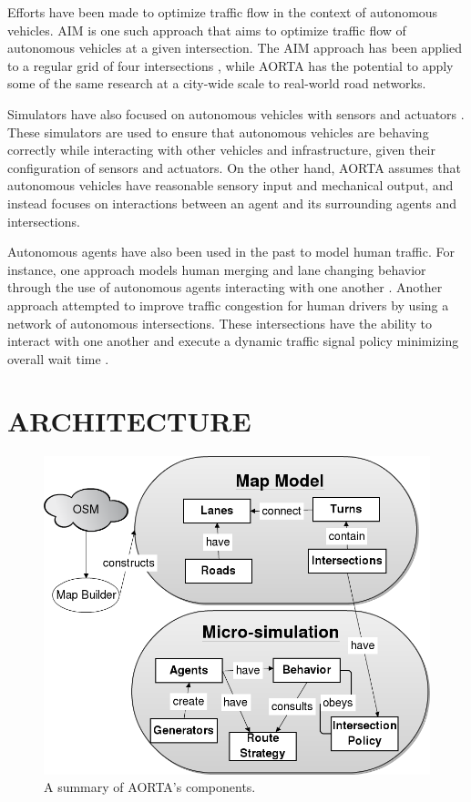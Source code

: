 \documentclass[letterpaper, 10 pt, conference]{ieeeconf}  %
\begin{document}
Efforts have been made to optimize traffic flow in the context of autonomous
vehicles. AIM \cite{JAIR08-dresner} is one such approach that aims to optimize
traffic flow of autonomous vehicles at a given intersection. The AIM approach
has been applied to a regular grid of four intersections
\cite{IROS11-hausknecht}, while AORTA has the potential to apply some of the
same research at a city-wide scale to real-world road networks.

Simulators have also focused on autonomous vehicles with sensors and actuators
\cite{figueiredo2009approach}. These simulators are used to ensure that
autonomous vehicles are behaving correctly while interacting with other
vehicles and infrastructure, given their configuration of sensors and
actuators. On the other hand, AORTA assumes that autonomous vehicles have
reasonable sensory input and mechanical output, and instead focuses on
interactions between an agent and its surrounding agents and intersections.

Autonomous agents have also been used in the past to model human traffic. For
instance, one approach models human merging and lane changing behavior through
the use of autonomous agents interacting with one another
\cite{hidas2002modelling}. Another approach attempted to improve traffic
congestion for human drivers by using a network of autonomous intersections.
These intersections have the ability to interact with one another and execute a
dynamic traffic signal policy minimizing overall wait time
\cite{manikonda2001autonomous}.


\section{ARCHITECTURE}
\label{sec:arch}

\begin{figure}
  \centering \includegraphics[scale=0.3]{architecture.png}
  \caption{A summary of AORTA's components.}
  \label{fig:arch}
  \vspace{-20pt}
\end{figure}
\end{document}
